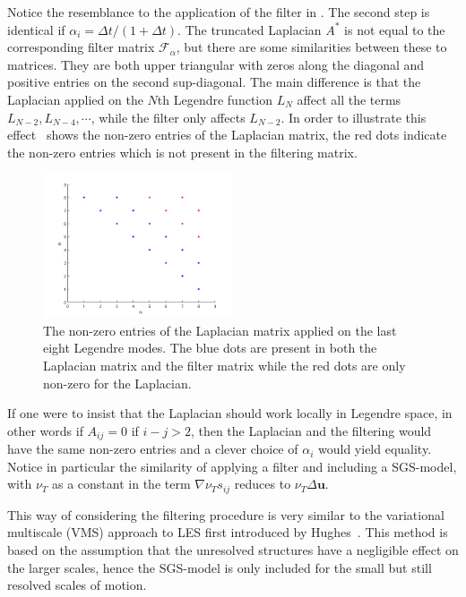 Notice the resemblance to the application of the filter in . The second step
is identical if $\alpha_i = \Delta t/(1+\Delta t)$. The truncated Laplacian $A^*$ is not equal to the corresponding
filter matrix $\mathcal{F}_{\alpha}$, but there are some similarities between these to matrices.
They are both upper triangular with zeros along the diagonal and positive entries on the second 
sup-diagonal. The main difference is that the Laplacian applied on the $N$th Legendre function 
$L_N$ affect all the terms $L_{N-2},L_{N-4},\cdots$, while the filter only affects $L_{N-2}$.
In order to illustrate this effect~ shows the non-zero entries of the
Laplacian matrix, the red dots indicate the non-zero entries which is not present in the filtering
matrix.
%
\begin{figure}[h]
	\centering
	\includegraphics[width=0.5\textwidth]{Figures/matrix.png}
	\caption{The non-zero entries of the Laplacian matrix applied on the last eight Legendre modes.
    The blue dots are present in both the Laplacian matrix and the filter matrix
    while the red dots are only non-zero for the Laplacian.}
	\label{fig:entries}
\end{figure}
%
If one were to insist that the Laplacian should work locally in Legendre space, in other words 
if $A_{ij}=0$ if $i-j>2$, then the Laplacian and the filtering would have the same non-zero entries 
and a clever choice of $\alpha_i$ would yield equality. Notice in particular the similarity of 
applying a filter and including a SGS-model, with $\nu_T$ as a constant in  the term 
$\nabla \nu_Ts_{ij}$ reduces to $\nu_T\Delta \mathbf{u}$.

This way of considering the filtering procedure is very similar to the variational multiscale (VMS) 
approach to LES first introduced by Hughes~\cite{Hughes}. This method is based on the assumption that
the unresolved structures have a negligible effect on the larger scales, hence the SGS-model is 
only included for the small but still resolved scales of motion.

